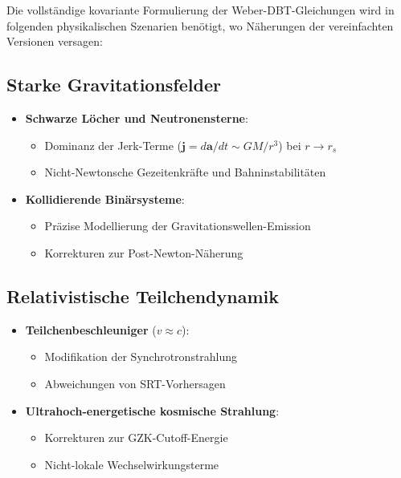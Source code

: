 Die vollständige kovariante Formulierung der Weber-DBT-Gleichungen wird in folgenden physikalischen Szenarien benötigt, wo Näherungen der vereinfachten Versionen versagen:

\subsection{Starke Gravitationsfelder}
\begin{itemize}
    \item \textbf{Schwarze Löcher und Neutronensterne}: 
    \begin{itemize}
        \item Dominanz der Jerk-Terme ($\mathbf{j} = d\mathbf{a}/dt \sim GM/r^3$) bei $r \to r_s$
        \item Nicht-Newtonsche Gezeitenkräfte und Bahninstabilitäten
    \end{itemize}
    
    \item \textbf{Kollidierende Binärsysteme}:
    \begin{itemize}
        \item Präzise Modellierung der Gravitationswellen-Emission
        \item Korrekturen zur Post-Newton-Näherung
    \end{itemize}
\end{itemize}

\subsection{Relativistische Teilchendynamik}
\begin{itemize}
    \item \textbf{Teilchenbeschleuniger} ($v \approx c$):
    \begin{itemize}
        \item Modifikation der Synchrotronstrahlung
        \item Abweichungen von SRT-Vorhersagen
    \end{itemize}
    
    \item \textbf{Ultrahoch-energetische kosmische Strahlung}:
    \begin{itemize}
        \item Korrekturen zur GZK-Cutoff-Energie
        \item Nicht-lokale Wechselwirkungsterme
    \end{itemize}
\end{itemize}

